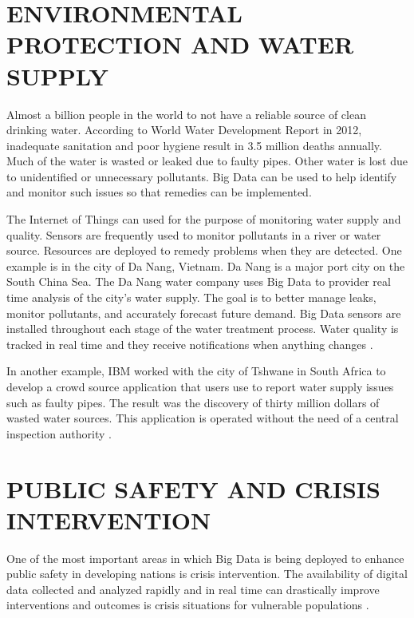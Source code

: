 \documentclass[sigconf]{acmart}
\begin{document}
\section{ENVIRONMENTAL PROTECTION AND WATER SUPPLY}

Almost a billion people in the world to not have a reliable source of clean drinking water. According to World Water Development Report in 2012, inadequate sanitation and poor hygiene result in 3.5 million deaths annually. Much of the water is wasted or leaked due to faulty pipes. Other water is lost due to unidentified or unnecessary pollutants. Big Data can be used to help identify and monitor such issues so that remedies can be implemented.  

The Internet of Things can used for the purpose of monitoring water supply and quality. Sensors are frequently used to monitor pollutants in a river or water source. Resources are deployed to remedy problems when they are detected.  One example is in the city of Da Nang, Vietnam. Da Nang is a major port city on the South China Sea. The Da Nang water company uses Big Data to provider real time analysis of the city’s water supply. The goal is to better manage leaks, monitor pollutants, and accurately forecast future demand. Big Data sensors are installed throughout each stage of the water treatment process. Water quality is tracked in real time and they receive notifications when anything changes \cite{DevEcon}.

In another example, IBM worked with the city of Tshwane in South Africa to develop a crowd source application that users use to report water supply issues such as faulty pipes. The result was the discovery of thirty million dollars of wasted water sources. This application is operated without the need of a central inspection authority \cite{www-google-Hffpst}.



\section{PUBLIC SAFETY AND CRISIS INTERVENTION}

One of the most important areas in which Big Data is being deployed to enhance public safety in developing nations is crisis intervention. The availability of digital data collected and analyzed rapidly and in real time can drastically improve interventions and outcomes is crisis situations for vulnerable populations \cite{www-google-GloPls}.  
\end{document}
